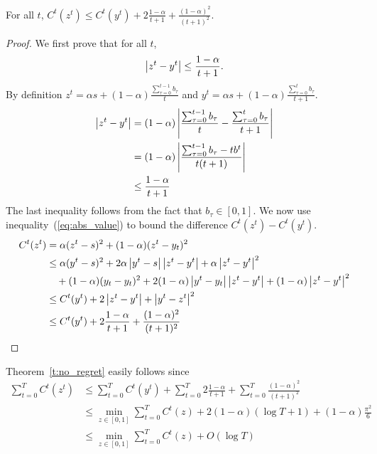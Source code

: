 \begin{lemma}
  For all $t$,
  \(C^t(z^t) \leq C^t(y^t) + 2\frac{1-\alpha}{t+1} + \frac{(1-\alpha)^2}{(t+1)^2}\).
\end{lemma}
\begin{proof}
  We first prove that for all $t$,
  \begin{equation}\label{eq:abs_value}
    \left|z^t - y^t \right| \leq \frac{1-\alpha}{t+1}.
  \end{equation}
  By definition
  \(z^t = \alpha s + (1-\alpha)\frac{\sum_{\tau = 0}^{t-1} b_\tau}{t}\)
  and
  \( y^t = \alpha s + (1-\alpha)\frac{\sum_{\tau = 0}^t b_\tau}{t+1}\).
  \begin{align*}
    \left|z^t - y^t\right|
    &=
    (1-\alpha)\left|\frac{\sum_{\tau = 0}^{t-1}b_\tau}{t}
    - \frac{\sum_{\tau = 0}^t b_\tau}{t+1}\right|\\
    &=
    (1-\alpha)\left|\frac{\sum_{\tau = 0}^{t-1}b_\tau -tb^t}{t(t+1)}\right|\\
    &\leq
    \frac{1-\alpha}{t+1}
  \end{align*}
  The last inequality follows from the fact that $b_\tau \in [0,1]$.
  We now use inequality~(\ref{eq:abs_value}) to bound the difference
  \( C^t(z^t) - C^t(y^t) \).
  \begin{align*}
    C^t(z^t)
    &=
    \alpha(z^t - s)^2 + (1 - \alpha)(z^t - y_t)^2 \\
    &\leq
    \alpha(y^t - s)^2 + 2\alpha\left|y^t -
    s\right|\left|z^t - y^t\right| + \alpha \left|z^t - y^t\right|^2 \\
    &\quad + (1-\alpha)(y_t - y_t)^2 +
    2(1-\alpha)\left|y^t - y_t\right|\left|z^t-y^t\right| + (1 - \alpha)\left|z^t - y^t\right|^2\\
    &\leq
    C^t(y^t) + 2\left|z^t - y^t\right| + \left|y^t - z^t\right|^2\\
    &\leq
    C^t(y^t) + 2\frac{1-\alpha}{t+1} + \frac{(1-\alpha)^2}{(t+1)^2}
  \end{align*}
\end{proof}

Theorem~\ref{t:no_regret} easily follows since
\begin{align*}
  \sum_{t=0}^T C^t(z^t)
  &\leq
  \sum_{t=0}^T C^t(y^t) + \sum_{t=0}^T 2\frac{1-\alpha}{t+1} +
  \sum_{t=0}^T \frac{(1-\alpha)^2}{(t+1)^2}\\
  &\leq
  \min_{ z \in [0,1]} \sum_{t=0}^T C^t(z) +
  2(1-\alpha)(\log T + 1) + (1-\alpha)\frac{\pi^2}{6}\\
  &\leq
  \min_{ z \in [0,1]} \sum_{t=0}^T C^t(z) + O(\log T)
\end{align*}
